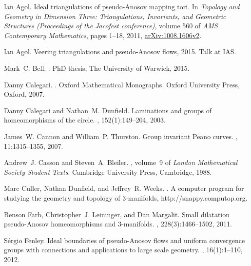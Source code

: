 \documentclass[12pt]{amsart}
\begin{document}

\begin{thebibliography}{10}

Ian Agol.
\newblock Ideal triangulations of pseudo-{A}nosov mapping tori.
\newblock In {\em Topology and Geometry in Dimension Three: Triangulations,
  Invariants, and Geometric Structures (Proceedings of the Jacofest
  conference)}, volume 560 of {\em AMS Contemporary Mathematics}, pages 1--18,
  2011,  \href{http://arxiv.org/abs/1008.1606v2}{{arXiv:1008.1606v2}}.

Ian Agol.
\newblock Veering triangulations and pseudo-{A}nosov flows, 2015.
\newblock Talk at IAS.

Mark~C. Bell.
.
\newblock PhD thesis, The University of Warwick, 2015.

Danny Calegari.
.
\newblock Oxford Mathematical Monographs. Oxford University Press, Oxford,
  2007.

Danny Calegari and Nathan~M. Dunfield.
\newblock Laminations and groups of homeomorphisms of the circle.
, 152(1):149--204, 2003.

James~W. Cannon and William~P. Thurston.
\newblock Group invariant {P}eano curves.
, 11:1315--1355, 2007.

Andrew~J. Casson and Steven~A. Bleiler.
,
  volume~9 of {\em London Mathematical Society Student Texts}.
\newblock Cambridge University Press, Cambridge, 1988.

Marc Culler, Nathan Dunfield, and Jeffrey~R. Weeks.
.
\newblock A computer program for studying the geometry and topology of
  3-manifolds, http://snappy.computop.org.

Benson Farb, Christopher~J. Leininger, and Dan Margalit.
\newblock Small dilatation pseudo-{A}nosov homeomorphisms and 3-manifolds.
, 228(3):1466--1502, 2011.

S\'ergio Fenley.
\newblock Ideal boundaries of pseudo-{A}nosov flows and uniform convergence
  groups with connections and applications to large scale geometry.
, 16(1):1--110, 2012.


\end{thebibliography}
\end{document}
